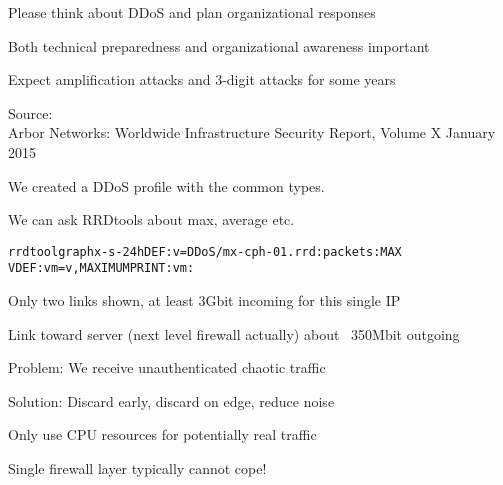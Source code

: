 \documentclass[20pt,landscape,a4paper,footrule]{foils}
\begin{document}
\begin{list1}
\item Please think about DDoS and plan organizational responses
\item Both technical preparedness and organizational awareness important
\end{list1}




\centerline{Expect amplification attacks and 3-digit attacks for some years}

Source:\\
Arbor Networks: Worldwide Infrastructure Security Report, Volume X January 2015




We created a DDoS profile with the common types.

We can ask RRDtools about max, average etc.
\begin{alltt}\small
rrdtool graph x -s -24h DEF:v=DDoS/mx-cph-01.rrd:packets:MAX
VDEF:vm=v,MAXIMUM PRINT:vm:%.lf
\end{alltt}





\centerline{Only two links shown, at least 3Gbit incoming for this single IP}

\centerline{Link toward server (next level firewall actually) about ~350Mbit outgoing}

\begin{list1}
\item Problem: We receive unauthenticated chaotic traffic

\item Solution: Discard early, discard on edge, reduce noise

\item Only use CPU resources for potentially real traffic
\end{list1}

\centerline{Single firewall layer typically cannot cope!}


\end{document}

